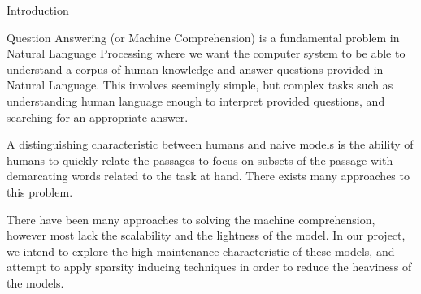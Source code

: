 \documentclass{article}
\begin{document}
\makeheader


\begin{psection}{Introduction}

	\sloppy
	Question Answering (or Machine Comprehension) is a fundamental problem in Natural Language Processing where we want the computer system to be able to understand a corpus of human knowledge and answer questions provided in Natural Language.
	This involves seemingly simple, but complex tasks such as understanding human language enough to interpret provided questions, and searching for an appropriate answer.

	A distinguishing characteristic between humans and naive models is the ability of humans to quickly relate the passages to focus on subsets of the passage with demarcating words related to the task at hand.
	There exists many approaches to this problem.

	There have been many approaches to solving the machine comprehension, however most lack the scalability and the lightness of the model. In our project, we intend to explore the high maintenance characteristic of these models, and attempt to apply sparsity inducing techniques in order to reduce the heaviness of the models.

\end{psection}
\end{document}
